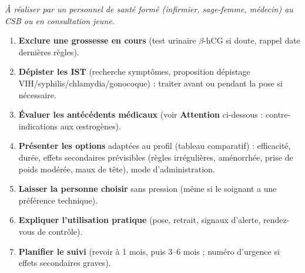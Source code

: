 \documentclass[11pt]{article}
\begin{document}
\begin{methode}
\emph{À réaliser par un personnel de santé formé (infirmier, sage-femme, médecin) au CSB ou en consultation jeune.}
\begin{enumerate}
    \item \textbf{Exclure une grossesse en cours} (test urinaire $\beta$-hCG si doute, rappel date dernières règles).
    \item \textbf{Dépister les IST} (recherche symptômes, proposition dépistage VIH/syphilis/chlamydia/gonocoque) : traiter avant ou pendant la pose si nécessaire.
    \item \textbf{Évaluer les antécédents médicaux} (voir \textbf{Attention} ci-dessous : contre-indications aux œstrogènes).
    \item \textbf{Présenter les options} adaptées au profil (tableau comparatif) : efficacité, durée, effets secondaires prévisibles (règles irrégulières, aménorrhée, prise de poids modérée, maux de tête), mode d'administration.
    \item \textbf{Laisser la personne choisir} sans pression (même si le soignant a une préférence technique).
    \item \textbf{Expliquer l'utilisation pratique} (pose, retrait, signaux d'alerte, rendez-vous de contrôle).
    \item \textbf{Planifier le suivi} (revoir à 1 mois, puis 3--6 mois ; numéro d'urgence si effets secondaires graves).
\end{enumerate}
\end{methode}
\end{document}
